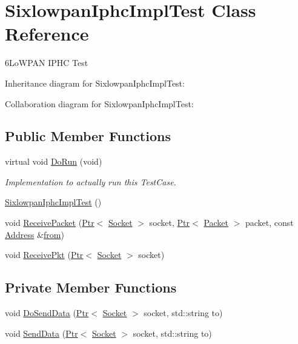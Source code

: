 \hypertarget{classSixlowpanIphcImplTest}{}\section{Sixlowpan\+Iphc\+Impl\+Test Class Reference}
\label{classSixlowpanIphcImplTest}


6\+Lo\+W\+P\+AN I\+P\+HC Test  




Inheritance diagram for Sixlowpan\+Iphc\+Impl\+Test\+:


Collaboration diagram for Sixlowpan\+Iphc\+Impl\+Test\+:
\subsection*{Public Member Functions}
\begin{DoxyCompactItemize}
\item 
virtual void \hyperlink{classSixlowpanIphcImplTest_a9fb0641fca5f024ac67c07510f418c02}{Do\+Run} (void)
\begin{DoxyCompactList}\small\item\em Implementation to actually run this Test\+Case. \end{DoxyCompactList}\item 
\hyperlink{classSixlowpanIphcImplTest_a1769a042eaead7cb1e9debbc604baebe}{Sixlowpan\+Iphc\+Impl\+Test} ()
\item 
void \hyperlink{classSixlowpanIphcImplTest_a9ea3273633eebc3960cd65b6b75e78cf}{Receive\+Packet} (\hyperlink{classns3_1_1Ptr}{Ptr}$<$ \hyperlink{classns3_1_1Socket}{Socket} $>$ socket, \hyperlink{classns3_1_1Ptr}{Ptr}$<$ \hyperlink{classns3_1_1Packet}{Packet} $>$ packet, const \hyperlink{classns3_1_1Address}{Address} \&\hyperlink{lte__amc_8m_a1b4c81ff74eb1a626b5ade44c81004b3}{from})
\item 
void \hyperlink{classSixlowpanIphcImplTest_ac90ce22d919fbddc1906333b102c6a35}{Receive\+Pkt} (\hyperlink{classns3_1_1Ptr}{Ptr}$<$ \hyperlink{classns3_1_1Socket}{Socket} $>$ socket)
\end{DoxyCompactItemize}
\subsection*{Private Member Functions}
\begin{DoxyCompactItemize}
\item 
void \hyperlink{classSixlowpanIphcImplTest_a73e2c04553c003fc96856d181bee897c}{Do\+Send\+Data} (\hyperlink{classns3_1_1Ptr}{Ptr}$<$ \hyperlink{classns3_1_1Socket}{Socket} $>$ socket, std\+::string to)
\item 
void \hyperlink{classSixlowpanIphcImplTest_a3e0d368bdbde2e52d3c70488e124ab5e}{Send\+Data} (\hyperlink{classns3_1_1Ptr}{Ptr}$<$ \hyperlink{classns3_1_1Socket}{Socket} $>$ socket, std\+::string to)
\end{DoxyCompactItemize}
